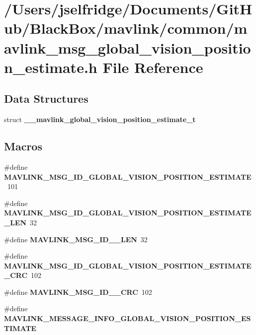 \section{/\+Users/jselfridge/\+Documents/\+Git\+Hub/\+Black\+Box/mavlink/common/mavlink\+\_\+msg\+\_\+global\+\_\+vision\+\_\+position\+\_\+estimate.h File Reference}
\label{mavlink__msg__global__vision__position__estimate_8h}
\subsection*{Data Structures}
\begin{DoxyCompactItemize}
\item 
struct \textbf{ \+\_\+\+\_\+mavlink\+\_\+global\+\_\+vision\+\_\+position\+\_\+estimate\+\_\+t}
\end{DoxyCompactItemize}
\subsection*{Macros}
\begin{DoxyCompactItemize}
\item 
\#define \textbf{ M\+A\+V\+L\+I\+N\+K\+\_\+\+M\+S\+G\+\_\+\+I\+D\+\_\+\+G\+L\+O\+B\+A\+L\+\_\+\+V\+I\+S\+I\+O\+N\+\_\+\+P\+O\+S\+I\+T\+I\+O\+N\+\_\+\+E\+S\+T\+I\+M\+A\+TE}~101
\item 
\#define \textbf{ M\+A\+V\+L\+I\+N\+K\+\_\+\+M\+S\+G\+\_\+\+I\+D\+\_\+\+G\+L\+O\+B\+A\+L\+\_\+\+V\+I\+S\+I\+O\+N\+\_\+\+P\+O\+S\+I\+T\+I\+O\+N\+\_\+\+E\+S\+T\+I\+M\+A\+T\+E\+\_\+\+L\+EN}~32
\item 
\#define \textbf{ M\+A\+V\+L\+I\+N\+K\+\_\+\+M\+S\+G\+\_\+\+I\+D\+\_\+\_\+\+L\+EN}~32
\item 
\#define \textbf{ M\+A\+V\+L\+I\+N\+K\+\_\+\+M\+S\+G\+\_\+\+I\+D\+\_\+\+G\+L\+O\+B\+A\+L\+\_\+\+V\+I\+S\+I\+O\+N\+\_\+\+P\+O\+S\+I\+T\+I\+O\+N\+\_\+\+E\+S\+T\+I\+M\+A\+T\+E\+\_\+\+C\+RC}~102
\item 
\#define \textbf{ M\+A\+V\+L\+I\+N\+K\+\_\+\+M\+S\+G\+\_\+\+I\+D\+\_\+\_\+\+C\+RC}~102
\item 
\#define \textbf{ M\+A\+V\+L\+I\+N\+K\+\_\+\+M\+E\+S\+S\+A\+G\+E\+\_\+\+I\+N\+F\+O\+\_\+\+G\+L\+O\+B\+A\+L\+\_\+\+V\+I\+S\+I\+O\+N\+\_\+\+P\+O\+S\+I\+T\+I\+O\+N\+\_\+\+E\+S\+T\+I\+M\+A\+TE}
\end{DoxyCompactItemize}
